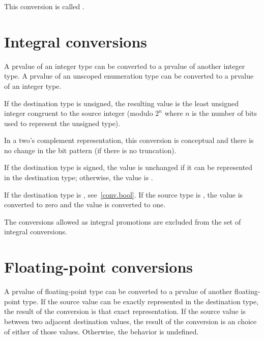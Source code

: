 \pnum
This conversion is called .

\section[conv.integral]{Integral conversions}

\pnum
{}%
A prvalue of an integer type can be converted to a prvalue of another
integer type. A prvalue of an unscoped enumeration type can be converted to
a prvalue of an integer type.

\pnum
{}%
If the destination type is unsigned, the resulting value is the least
unsigned integer congruent to the source integer (modulo $2^n$ where $n$
is the number of bits used to represent the unsigned type).
%
\begin{note}
In a two's complement representation, this conversion is conceptual and
there is no change in the bit pattern (if there is no truncation).
\end{note}

\pnum
{}%
If the destination type is signed, the value is unchanged if it can be
represented in the destination type; otherwise,
the value is .

\pnum
{}%
If the destination type is , see~\ref{conv.bool}. If the
source type is , the value  is converted to
zero and the value  is converted to one.

\pnum
The conversions allowed as integral promotions are excluded from the set
of integral conversions.

\section[conv.double]{Floating-point conversions}

\pnum
{}%
A prvalue of floating-point type can be converted to a prvalue of
another floating-point type. If the source value can be exactly
represented in the destination type, the result of the conversion is
that exact representation. If the source value is between two adjacent
destination values, the result of the conversion is an
 choice of either of those values.
Otherwise, the behavior is undefined.

